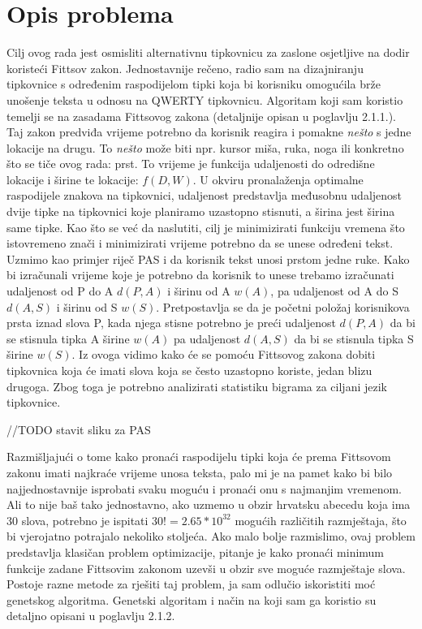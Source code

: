 \documentclass[times, utf8, zavrsni]{fer}
\begin{document}
\section{Opis problema}
Cilj ovog rada jest osmisliti alternativnu tipkovnicu za zaslone osjetljive na dodir koristeći Fittsov zakon. Jednostavnije rečeno, radio sam na dizajniranju tipkovnice s određenim raspodijelom tipki koja bi korisniku omogućila brže unošenje teksta u odnosu na QWERTY tipkovnicu. Algoritam koji sam koristio temelji se na zasadama Fittsovog zakona (detaljnije opisan u poglavlju 2.1.1.). Taj zakon predviđa vrijeme potrebno da korisnik reagira i pomakne \emph{nešto} s jedne lokacije na drugu. To \emph{nešto} može biti npr. kursor miša, ruka, noga ili konkretno što se tiče ovog rada: prst. To vrijeme je funkcija udaljenosti do odredišne lokacije i širine te lokacije: $f(D,W)$. U okviru pronalaženja optimalne raspodijele znakova na tipkovnici, udaljenost predstavlja međusobnu udaljenost dvije tipke na tipkovnici koje planiramo uzastopno stisnuti, a širina jest širina same tipke. Kao što se već da naslutiti, cilj je minimizirati funkciju vremena što istovremeno znači i minimizirati vrijeme potrebno da se unese određeni tekst. Uzmimo kao primjer riječ PAS i da korisnik tekst unosi prstom jedne ruke. Kako bi izračunali vrijeme koje je potrebno da korisnik to unese trebamo izračunati udaljenost od P do A $d(P,A)$ i širinu od A $w(A)$, pa udaljenost od A do S $d(A,S)$ i širinu od S $w(S)$. Pretpostavlja se da je početni položaj korisnikova prsta iznad slova P, kada njega stisne potrebno je preći udaljenost $d(P,A)$ da bi se stisnula tipka A širine $w(A)$ pa udaljenost $d(A,S)$ da bi se stisnula tipka S širine $w(S)$. Iz ovoga vidimo kako će se pomoću Fittsovog zakona dobiti tipkovnica koja će imati slova koja se često uzastopno koriste, jedan blizu drugoga. Zbog toga je potrebno analizirati statistiku bigrama za ciljani jezik tipkovnice.

//TODO stavit sliku za PAS

Razmišljajući o tome kako pronaći raspodijelu tipki koja će prema Fittsovom zakonu imati najkraće vrijeme unosa teksta, palo mi je na pamet kako bi bilo najjednostavnije isprobati svaku moguću i pronaći onu s najmanjim vremenom. Ali to nije baš tako jednostavno, ako uzmemo u obzir hrvatsku abecedu koja ima 30 slova, potrebno je ispitati $30! = 2.65*10^32$ mogućih različitih razmještaja, što bi vjerojatno potrajalo nekoliko stoljeća. Ako malo bolje razmislimo, ovaj problem predstavlja klasičan problem optimizacije, pitanje je kako pronaći minimum funkcije zadane Fittsovim zakonom uzevši u obzir sve moguće razmještaje slova. Postoje razne metode za rješiti taj problem, ja sam odlučio iskoristiti moć genetskog algoritma. Genetski algoritam i način na koji sam ga koristio su detaljno opisani u poglavlju 2.1.2.
\end{document}
